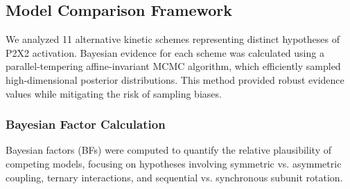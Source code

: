 \documentclass[pdflatex,sn-mathphys-num]{sn-jnl}%
\theoremstyle{thmstyleone}%
\theoremstyle{thmstyletwo}%
\theoremstyle{thmstylethree}%
\begin{document}

\subsection{Model Comparison Framework}
We analyzed 11 alternative kinetic schemes representing distinct hypotheses of P2X2 activation. Bayesian evidence for each scheme was calculated using a parallel-tempering affine-invariant MCMC algorithm, which efficiently sampled high-dimensional posterior distributions. This method provided robust evidence values while mitigating the risk of sampling biases.


\subsubsection{Bayesian Factor Calculation}
Bayesian factors (BFs) were computed to quantify the relative plausibility of competing models, focusing on hypotheses involving symmetric vs. asymmetric coupling, ternary interactions, and sequential vs. synchronous subunit rotation.

\newpage
\end{document}
